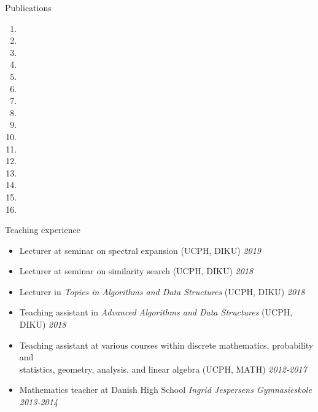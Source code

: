 \documentclass{resume} %
\begin{document}
\begin{rSection}{Publications}

\begin{enumerate}
	\item {}
	\item {}
	\item {}
	\item {}
	\item {}
	\item {}
	\item {}
	\item {}
	\item {}
	\item {}
	\item {}
	\item {}
	\item {}
	\item {}
	\item {}
	\item {}\end{enumerate}
\end{rSection}



\begin{rSection}{Teaching experience}
 \begin{itemize}
 \item Lecturer at seminar on spectral expansion (UCPH, DIKU) \hfill{\emph{2019}}
 \item Lecturer at seminar on similarity search (UCPH, DIKU) \hfill{\emph{2018}}
 \item Lecturer in \emph{Topics in Algorithms and Data Structures} (UCPH, DIKU) \hfill{\emph{2018}}
 \item Teaching assistant in \emph{Advanced Algorithms and Data Structures} (UCPH, DIKU) \hfill{\emph{2018}}
 \item Teaching assistant at various courses within discrete mathematics, probability and \\ statistics, geometry, analysis, and linear algebra (UCPH, MATH) \hfill{\emph{2012-2017}}
 \item Mathematics teacher at Danish High School \emph{Ingrid Jespersens Gymnasieskole} \hfill{\emph{2013-2014}}
 \end{itemize}
 \end{rSection}
\end{document}
